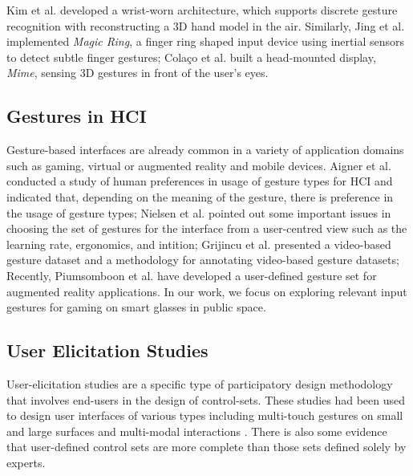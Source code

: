 \documentclass{sigchi}
\begin{document}
    Kim et al.\cite{Kim:2012:DFI:2380116.2380139} developed a wrist-worn architecture, which supports discrete gesture recognition with reconstructing a 3D hand model in the air. Similarly, Jing et al.\cite{Jing:2013:MRS:2541831.2541875} implemented \textsl{Magic Ring}, a finger ring shaped input device using inertial sensors to detect subtle finger gestures; Cola\c{c}o et al.\cite{Colaco:2013:MCL:2501988.2502042} built a head-mounted display, \textsl{Mime}, sensing 3D gestures in front of the user's eyes. 

    \subsection{Gestures in HCI}
    Gesture-based interfaces are already common in a variety of application domains such as gaming, virtual or augmented reality and mobile devices\cite{karam2005taxonomy}. Aigner et al.\cite{aigner2012understanding} conducted a study of human preferences in usage of gesture types for HCI and indicated that, depending on the meaning of the gesture, there is preference in the usage of gesture types;
    Nielsen et al.\cite{nielsen2004procedure} pointed out some important issues in choosing the set of gestures for the interface from a user-centred view such as the learning rate, ergonomics, and intition;
    Grijincu et al.\cite{Grijincu:2014:UIG:2669485.2669511} presented a video-based gesture dataset and a methodology for annotating video-based gesture datasets; 
    Recently, Piumsomboon et al.\cite{Piumsomboon:2013:UGA:2468356.2468527} have developed a user-defined gesture set for augmented reality applications. In our work, we focus on exploring relevant input gestures for gaming on smart glasses in public space.

    \subsection{User Elicitation Studies}
    User-elicitation studies are a specific type of participatory design methodology that involves end-users in the design of control-sets\cite{Morris:2012:WWI:2396636.2396651}. These studies had been used to design user interfaces of various types including multi-touch gestures on small and large surfaces\cite{Anthony:2012:IRC:2396636.2396671,Wobbrock:2009:UGS:1518701.1518866,Findlater:2012:BQA:2207676.2208660} and multi-modal interactions \cite{Morris:2012:WWI:2396636.2396651,Liang:2012:USG:2350046.2350098}. There is also some evidence that user-defined control sets are more complete than those sets defined solely by experts\cite{Anthony:2012:IRC:2396636.2396671,Pyryeskin:2012:CEG:2396636.2396638,Wobbrock:2009:UGS:1518701.1518866}.
\end{document}
